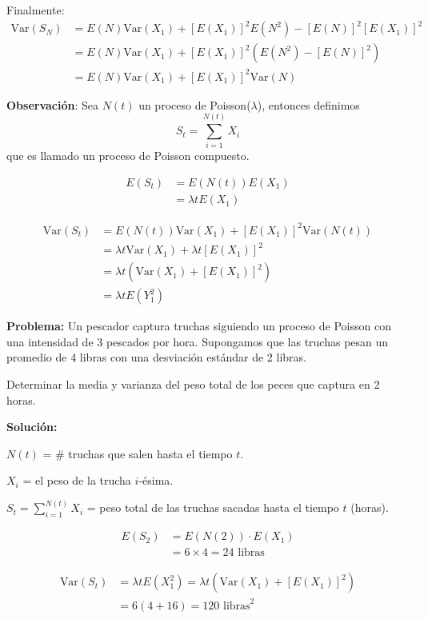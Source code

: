 \documentclass[12pt,a4paper]{article}
\begin{document}
Finalmente:
\begin{align*}
\text{Var}(S_N) &= E(N)\text{Var}(X_1) + [E(X_1)]^2 E(N^2) - [E(N)]^2[E(X_1)]^2 \\
&= E(N)\text{Var}(X_1) + [E(X_1)]^2\left(E(N^2) - [E(N)]^2\right) \\
&= E(N)\text{Var}(X_1) + [E(X_1)]^2\text{Var}(N)
\end{align*}

\textbf{Observación}: Sea $N(t)$ un proceso de Poisson($\lambda$), entonces definimos 
\begin{equation*}
S_t = \sum_{i=1}^{N(t)} X_i
\end{equation*}
que es llamado un proceso de Poisson compuesto.

\begin{align*}
E(S_t) &= E(N(t)) E(X_1) \\
&= \lambda t E(X_1)
\end{align*}

\begin{align*}
\text{Var}(S_t) &= E(N(t))\text{Var}(X_1) + [E(X_1)]^2\text{Var}(N(t)) \\
&= \lambda t \text{Var}(X_1) + \lambda t [E(X_1)]^2 \\
&= \lambda t \left(\text{Var}(X_1) + [E(X_1)]^2\right) \\
&= \lambda t E(Y_1^2)
\end{align*}

\textbf{Problema:} Un pescador captura truchas siguiendo un proceso de Poisson con una intensidad de 3 pescados por hora. Supongamos que las truchas pesan un promedio de 4 libras con una desviación estándar de 2 libras.

Determinar la media y varianza del peso total de los peces que captura en 2 horas.

\textbf{Solución:}

$N(t)$ = \# truchas que salen hasta el tiempo $t$.

$X_i$ = el peso de la trucha $i$-ésima.

$S_t = \sum_{i=1}^{N(t)} X_i$ = peso total de las truchas sacadas hasta el tiempo $t$ (horas).

\begin{align*}
E(S_2) &= E(N(2)) \cdot E(X_1) \\
&= 6 \times 4 = 24 \text{ libras}
\end{align*}

\begin{align*}
\text{Var}(S_t) &= \lambda t E(X_1^2) = \lambda t \left(\text{Var}(X_1) + [E(X_1)]^2\right) \\
&= 6(4 + 16) = 120 \text{ libras}^2
\end{align*}
\end{document}
